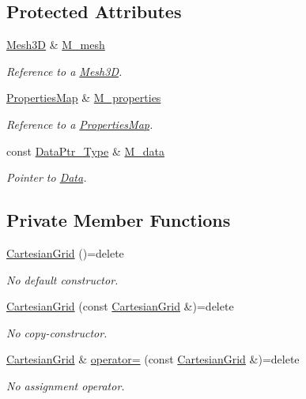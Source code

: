 \subsection*{Protected Attributes}
\begin{DoxyCompactItemize}
\item 
\hyperlink{classFVCode3D_1_1Mesh3D}{Mesh3D} \& \hyperlink{classFVCode3D_1_1CartesianGrid_a40c64e663b3d2de02b852403c75495fb}{M\+\_\+mesh}
\begin{DoxyCompactList}\small\item\em Reference to a \hyperlink{classFVCode3D_1_1Mesh3D}{Mesh3D}. \end{DoxyCompactList}\item 
\hyperlink{classFVCode3D_1_1PropertiesMap}{Properties\+Map} \& \hyperlink{classFVCode3D_1_1CartesianGrid_a5d2cd7d64a7feeb775251173f14892af}{M\+\_\+properties}
\begin{DoxyCompactList}\small\item\em Reference to a \hyperlink{classFVCode3D_1_1PropertiesMap}{Properties\+Map}. \end{DoxyCompactList}\item 
const \hyperlink{namespaceFVCode3D_a3d19a370a98afe491a9e17a646a9c56f}{Data\+Ptr\+\_\+\+Type} \& \hyperlink{classFVCode3D_1_1CartesianGrid_a8548798ae1d2a011869ed314a1ebb8f3}{M\+\_\+data}
\begin{DoxyCompactList}\small\item\em Pointer to \hyperlink{classFVCode3D_1_1Data}{Data}. \end{DoxyCompactList}\end{DoxyCompactItemize}
\subsection*{Private Member Functions}
\begin{DoxyCompactItemize}
\item 
\hyperlink{classFVCode3D_1_1CartesianGrid_a4cee64d474ef4bb8ab0a766580cf04c1}{Cartesian\+Grid} ()=delete
\begin{DoxyCompactList}\small\item\em No default constructor. \end{DoxyCompactList}\item 
\hyperlink{classFVCode3D_1_1CartesianGrid_a28166f3bbaf12834c14af98c078234dd}{Cartesian\+Grid} (const \hyperlink{classFVCode3D_1_1CartesianGrid}{Cartesian\+Grid} \&)=delete
\begin{DoxyCompactList}\small\item\em No copy-\/constructor. \end{DoxyCompactList}\item 
\hyperlink{classFVCode3D_1_1CartesianGrid}{Cartesian\+Grid} \& \hyperlink{classFVCode3D_1_1CartesianGrid_a4054d121d72d724c1b5cc99cfbbab1a6}{operator=} (const \hyperlink{classFVCode3D_1_1CartesianGrid}{Cartesian\+Grid} \&)=delete
\begin{DoxyCompactList}\small\item\em No assignment operator. \end{DoxyCompactList}\end{DoxyCompactItemize}


